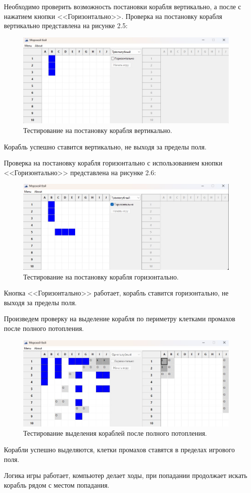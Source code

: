 Необходимо проверить возможность постановки корабля вертикально, а после с нажатием кнопки <<Горизонтально>>. Проверка на постановку корабля вертикально представлена на рисунке 2.5:
\begin{figure}[H]
\graphicspath{ {img/} }
\centering
\includegraphics[width = 15cm]{Вертикально.jpg}
\caption{Тестирование на постановку корабля вертикально.}
\end{figure}
Корабль успешно ставится вертикально, не выходя за пределы поля.

Проверка на постановку корабля горизонтально с использованием кнопки <<Горизонтально>> представлена на рисунке 2.6:
\begin{figure}[H]
\graphicspath{ {img/} }
\centering
\includegraphics[width = 15cm]{горизонтально.jpg}
\caption{Тестирование на постановку корабля горизонтально.}
\end{figure}
Кнопка <<Горизонтально>> работает, корабль ставится горизонтально, не выходя за пределы поля.

Произведем проверку на выделение корабля по периметру клетками промахов после полного потопления.
\begin{figure}[H]
\graphicspath{ {img/} }
\centering
\includegraphics[width = 15cm]{выделение.jpg}
\caption{Тестирование выделения кораблей после полного потопления.}
\end{figure}
Корабли успешно выделяются, клетки промахов ставятся в пределах игрового поля.

Логика игры работает, компьютер делает ходы, при попадании продолжает искать корабль рядом с местом попадания.
